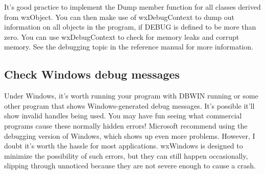 It's good practice to implement the Dump member function for all
classes derived from wxObject. You can then make use of wxDebugContext
to dump out information on all objects in the program, if DEBUG is
defined to be more than zero. You can use wxDebugContext to check for
memory leaks and corrupt memory. See the debugging topic in the
reference manual for more information.

\subsection{Check Windows debug messages}

Under Windows, it's worth running your program with DBWIN running or
some other program that shows Windows-generated debug messages. It's
possible it'll show invalid handles being used. You may have fun seeing
what commercial programs cause these normally hidden errors! Microsoft
recommend using the debugging version of Windows, which shows up even
more problems. However, I doubt it's worth the hassle for most
applications. wxWindows is designed to minimize the possibility of such
errors, but they can still happen occasionally, slipping through unnoticed
because they are not severe enough to cause a crash.
